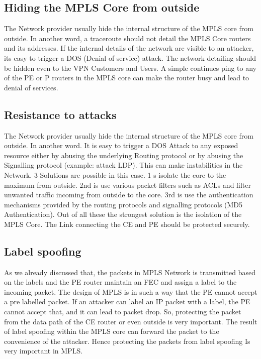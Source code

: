 \subsection{Hiding the MPLS Core from outside}


The Network provider usually hide the internal structure of the MPLS core from outside. In another word, a traceroute should not detail the MPLS Core routers and its addresses. If the internal details of the network are visible to an attacker, its easy to trigger a DOS (Denial-of-service) attack. The network detailing should be hidden even to the VPN Customers and Users. A simple continues ping to any of the PE or P routers in the MPLS core can make the router busy and lead to denial of services.
\subsection{Resistance to attacks}

The Network provider usually hide the internal structure of the MPLS core from outside. In another word. It is easy to trigger a DOS Attack to any exposed resource either by abusing the underlying Routing protocol or by abusing the Signalling protocol (example: attack LDP). This can make instabilities in the Network. 3 Solutions are possible in this case. 1 s isolate the core to the maximum from outside. 2nd is use various packet filters such as ACLs and filter unwanted traffic incoming from outside to the core. 3rd is use the authentication mechanisms provided by the routing protocols and signalling protocols (MD5 Authentication). Out of all these the strongest solution is the isolation of the MPLS Core. The Link connecting the CE and PE should be protected securely.
\subsection{Label spoofing}


As we already discussed that, the packets in MPLS Network is transmitted based on the labels and the PE router maintain an FEC and assign a label to the incoming packet. The design of MPLS is in such a way that the PE cannot accept a pre labelled packet. If an attacker can label an IP packet with a label, the PE cannot accept that, and it can lead to packet drop. So, protecting the packet from the data path of the CE router or even outside is very important. The result of label spoofing within the MPLS core can forward the packet to the convenience of the attacker. Hence protecting the packets from label spoofing Is very important in MPLS.

